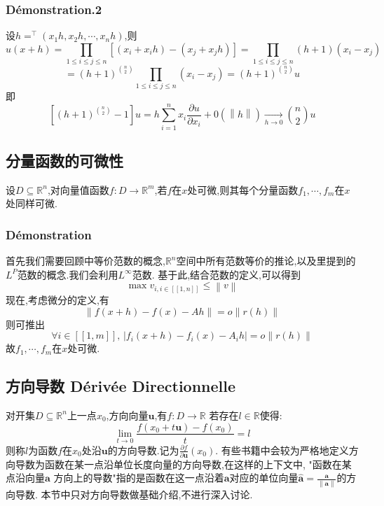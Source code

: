 \documentclass[12pt, a4paper, oneside]{ctexbook}
\newcommand{\R }{\mathbb{R}}%
\begin{document}
    \subsubsection{Démonstration.2}
    设$h=^\top(x_1h,x_2h,\cdots,x_nh)$,则
    $$
    u(x+h)=\prod _{1\leq i\leq j\leq n}[(x_i+x_ih)-(x_j+x_jh)]=\prod _{1\leq i\leq j\leq n}(h+1)(x_i-x_j)
    $$
    $$
    =(h+1)^{\binom{n}{2} }\prod _{1\leq i\leq j\leq n}(x_i-x_j)=(h+1)^{\binom{n}{2} }u
    $$
    即
    $$
    [(h+1)^{\binom{n}{2} }-1]u=h\sum_{i = 1}^{n}  x_i \frac{\partial u}{\partial x_i}+0(\left\lVert h\right\rVert )\xrightarrow[h\rightarrow 0]{}{\binom{n}{2} }u
    $$
\subsection{分量函数的可微性}
    设$D\subseteq \R^n$,对向量值函数$f:D\rightarrow \R^m$,若$f$在$x$处可微,则其每个分量函数$f_1,\cdots,f_m$在$x$处同样可微.
    \subsubsection{Démonstration}
    首先我们需要回顾中等价范数的概念,$\R^n$空间中所有范数等价的推论,以及里提到的$L^P$范数的概念.我们会利用$L^\infty$范数.
    基于此,结合范数的定义,可以得到
    $$
    \max v_{i,i\in[\![1,n]\!] }\leq \left\lVert v\right\rVert 
    $$
    现在,考虑微分的定义,有
    $$
    \left\lVert f(x+h)-f(x)-Ah\right\rVert =o\left\lVert r(h) \right\rVert 
    $$
    则可推出
    $$
    \forall i \in [\![1,m]\!],\,\left\lvert f_i(x+h)-f_i(x)-A_ih \right\rvert =o\left\lVert r(h) \right\rVert
    $$
    故$f_1,\cdots,f_m$在$x$处可微.
\subsection{方向导数 Dérivée Directionnelle}
    对开集$D\subseteq \mathbb{R}^n$上一点$x_0$,方向向量$\textbf{u}$,有$f:D\rightarrow \R$
    若存在$l\in\R$使得:
    $$
    \lim_{t \to 0} \frac{f(x_0+t\textbf{u})-f(x_0)}{t} =l
    $$
    则称$l$为函数$f$在$x_0$处沿$\textbf{u}$的方向导数.记为$\frac{\partial f}{\partial \textbf{u}}(x_0)$.
    有些书籍中会较为严格地定义方向导数为函数在某一点沿单位长度向量的方向导数,在这样的上下文中,
    "函数在某点沿向量$\mathbf{a}$ 方向上的导数"指的是函数在这一点沿着$\mathbf{a}$对应的单位向量$\hat{\mathbf{a}}=\frac{\mathbf{a}}{\left\lVert \mathbf{a}\right\rVert }$的方向导数.
    本节中只对方向导数做基础介绍,不进行深入讨论.
\end{document}
